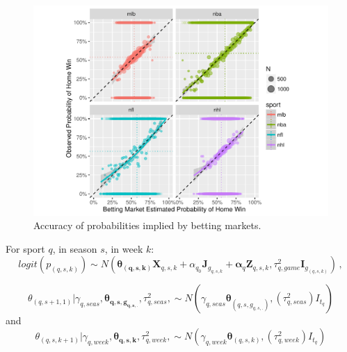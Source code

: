 \documentclass{beamer}\usepackage[]{graphicx}\usepackage[]{color}
\makeatletter
\def\maxwidth{ %
  \ifdim\Gin@nat@width>\linewidth
    \linewidth
  \else
    \Gin@nat@width
  \fi
}
\newenvironment{knitrout}{}{} %
\makeatother
\begin{document}
\begin{frame}[fragile]
\begin{knitrout}
\color{fgcolor}\begin{figure}
\includegraphics[width=\maxwidth]{figure/betting-1} \caption[Accuracy of probabilities implied by betting markets]{Accuracy of probabilities implied by betting markets. }\label{fig:betting}
\end{figure}


\end{knitrout}
\end{frame}


\begin{frame}
For sport $q$, in season $s$, in week $k$: 
$$
logit(p_{(q,s,k)}) \sim N(\mathbf{\theta_{(q,s,k)}}\mathbf{X}_{q,s,k} + \alpha_{q_0}\mathbf{J}_{g_{q,s,k}} + \mathbf{\alpha}_{q}\mathbf{Z}_{q,s,k}, \tau^{2}_{q,game}\mathbf{I}_{g_{(q,s,k)}}) \,, 
$$

$$
\theta_{(q,s+1,1)} | \gamma_{q,seas}, \mathbf{\theta_{q,s,g_{q,s,.}}}, \tau^{2}_{q,seas},  \sim N (\gamma_{q,seas}\mathbf{\theta}_{(q,s,g_{q,s,.})},(\tau^{2}_{q,seas})I_{t_{q}})
$$
and 
$$
\theta_{(q,s,k+1)} | \gamma_{q,week}, \mathbf{\theta_{q,s,k}}, \tau^{2}_{q,week},  \sim N (\gamma_{q,week}\mathbf{\theta}_{(q,s,k)},(\tau^{2}_{q,week})I_{t_{q}})
$$
\end{frame}
\end{document}
